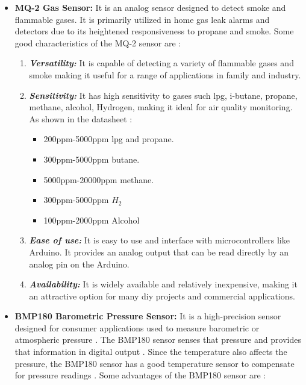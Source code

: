 \begin{itemize}
    \item \textbf{MQ-2 Gas Sensor:} It is an analog sensor designed to detect smoke and flammable gases. It is primarily utilized in home gas leak alarms and detectors due to its heightened responsiveness to propane and smoke. Some good characteristics of the MQ-2 sensor are \cite{mq2_datasheet, components101_mq2}:

        \begin{enumerate}
            \item \textbf{\textit{Versatility:}} It is capable of detecting a variety of flammable gases and smoke making it useful for a range of applications in family and industry.

            \item \textbf{\textit{Sensitivity:}} It has high sensitivity to gases such \acrfull{lpg}, i-butane, propane, methane, alcohol, Hydrogen, making it ideal for air quality monitoring. As shown in the datasheet \cite{mq2_datasheet}:

            \begin{itemize}
                \item 200ppm-5000ppm \acrshort{lpg} and propane.

                \item 300ppm-5000ppm butane.

                \item 5000ppm-20000ppm methane.

                \item 300ppm-5000ppm $H_{2}$

                \item 100ppm-2000ppm Alcohol
            \end{itemize}

            \item \textbf{\textit{Ease of use:}} It is easy to use and interface with microcontrollers like Arduino. It provides an analog output that can be read directly by an analog pin on the Arduino.

            \item \textbf{\textit{Availability:}} It is widely available and relatively inexpensive, making it an attractive option for many \acrfull{diy} projects and commercial applications.
        \end{enumerate}

    \item \textbf{BMP180 Barometric Pressure Sensor:} It is a high-precision sensor designed for consumer applications used to measure barometric or atmospheric pressure \cite{components101_bmp180}. The BMP180 sensor senses that pressure and provides that information in digital output \cite{bmp180_datasheet}. Since the temperature also affects the pressure, the BMP180 sensor has a good temperature sensor to compensate for pressure readings \cite{components101_bmp180}. Some advantages of the BMP180 sensor are \cite{components101_bmp180, bmp180_datasheet}:


\end{itemize}
